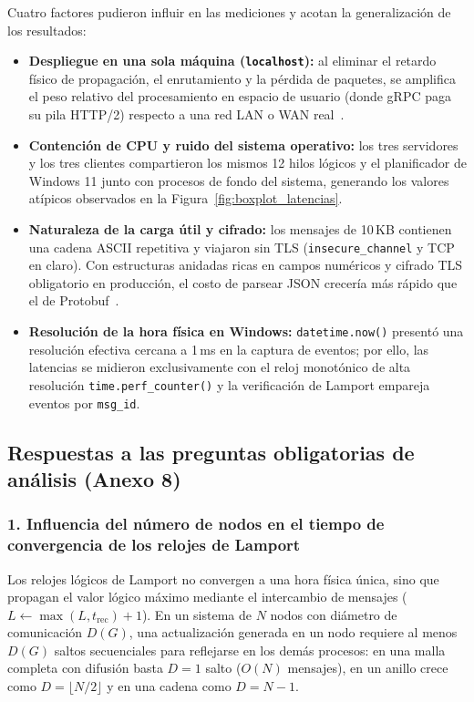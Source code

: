 \documentclass[12pt,a4paper]{article}
\begin{document}
Cuatro factores pudieron influir en las mediciones y acotan la generalización de los resultados:
\begin{itemize}
  \item \textbf{Despliegue en una sola máquina (\texttt{localhost}):} al eliminar el retardo físico de propagación, el enrutamiento y la pérdida de paquetes, se amplifica el peso relativo del procesamiento en espacio de usuario (donde gRPC paga su pila HTTP/2) respecto a una red LAN o WAN real~\cite{ciftci2025review}.
  \item \textbf{Contención de CPU y ruido del sistema operativo:} los tres servidores y los tres clientes compartieron los mismos 12 hilos lógicos y el planificador de Windows 11 junto con procesos de fondo del sistema, generando los valores atípicos observados en la Figura~\ref{fig:boxplot_latencias}.
  \item \textbf{Naturaleza de la carga útil y cifrado:} los mensajes de 10\,KB contienen una cadena ASCII repetitiva y viajaron sin TLS (\texttt{insecure\_channel} y TCP en claro). Con estructuras anidadas ricas en campos numéricos y cifrado TLS obligatorio en producción, el costo de parsear JSON crecería más rápido que el de Protobuf~\cite{mehdi2026crosslanguage,haindl2024security}.
  \item \textbf{Resolución de la hora física en Windows:} \texttt{datetime.now()} presentó una resolución efectiva cercana a 1\,ms en la captura de eventos; por ello, las latencias se midieron exclusivamente con el reloj monotónico de alta resolución \texttt{time.perf\_counter()} y la verificación de Lamport empareja eventos por \texttt{msg\_id}.
\end{itemize}

\subsection{Respuestas a las preguntas obligatorias de análisis (Anexo 8)}

\subsubsection{1. Influencia del número de nodos en el tiempo de convergencia de los relojes de Lamport}

Los relojes lógicos de Lamport no convergen a una hora física única, sino que propagan el valor lógico máximo mediante el intercambio de mensajes ($L \leftarrow \operatorname{max}(L, t_{\mathrm{rec}}) + 1$). En un sistema de $N$ nodos con diámetro de comunicación $D(G)$, una actualización generada en un nodo requiere al menos $D(G)$ saltos secuenciales para reflejarse en los demás procesos: en una malla completa con difusión basta $D = 1$ salto ($O(N)$ mensajes), en un anillo crece como $D = \lfloor N/2 \rfloor$ y en una cadena como $D = N - 1$.
\end{document}
